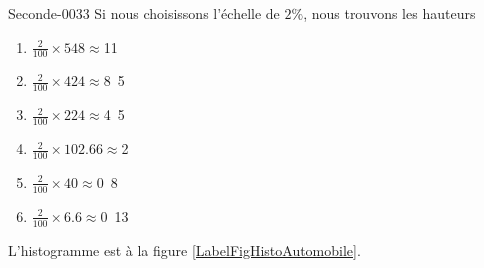 \begin{corrige}{Seconde-0033}
    Si nous choisissons l'échelle de \( 2\%\), nous trouvons les hauteurs
    \begin{enumerate}
        \item
            \( \frac{ 2 }{ 100 }\times 548\approx \)\unit{11}{\centi\meter}
        \item
            \( \frac{ 2 }{ 100 }\times 424\approx \)\unit{8.5}{\centi\meter}
        \item
            \( \frac{ 2 }{ 100 }\times 224\approx \)\unit{4.5}{\centi\meter}
        \item
            \( \frac{ 2 }{ 100 }\times 102.66\approx \)\unit{2}{\centi\meter}
        \item
            \( \frac{ 2 }{ 100 }\times 40\approx \)\unit{0.8}{\centi\meter}
        \item
            \( \frac{ 2 }{ 100 }\times 6.6\approx \)\unit{0.13}{\centi\meter}
    \end{enumerate}

L'histogramme est à la figure \ref{LabelFigHistoAutomobile}.
\newcommand{\CaptionFigHistoAutomobile}{L'histogramme de l'exercice \ref{exoSeconde-0033}.}


\end{corrige}
